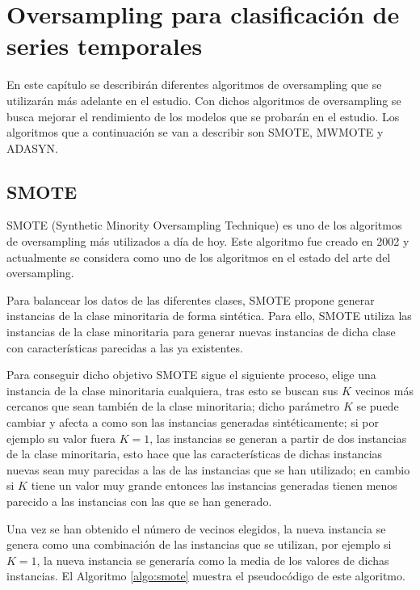 \chapter{Oversampling para clasificación de series temporales}
En este capítulo se describirán diferentes algoritmos de oversampling que se utilizarán más adelante en el estudio. Con dichos algoritmos de oversampling se busca mejorar el rendimiento de los modelos que se probarán en el estudio. Los algoritmos que a continuación se van a describir son SMOTE, MWMOTE y ADASYN.

\section{SMOTE}
SMOTE (Synthetic Minority Oversampling Technique) \cite{chawla2002smote} es uno de los algoritmos de oversampling más utilizados a día de hoy. Este algoritmo fue creado en 2002 y actualmente se considera como uno de los algoritmos en el estado del arte del oversampling.\newline

Para balancear los datos de las diferentes clases, SMOTE propone generar instancias de la clase minoritaria de forma sintética. Para ello, SMOTE utiliza las instancias de la clase minoritaria para generar nuevas instancias de dicha clase con características parecidas a las ya existentes.\newline

Para conseguir dicho objetivo SMOTE sigue el siguiente proceso, elige una instancia de la clase minoritaria cualquiera, tras esto se buscan sus $K$ vecinos más cercanos que sean también de la clase minoritaria; dicho parámetro $K$ se puede cambiar y afecta a como son las instancias generadas sintéticamente; si por ejemplo su valor fuera $K=1$, las instancias se generan a partir de dos instancias de la clase minoritaria, esto hace que las características de dichas instancias nuevas sean muy parecidas a las de las instancias que se han utilizado; en cambio si $K$ tiene un valor muy grande entonces las instancias generadas tienen menos parecido a las instancias con las que se han generado.\newline

Una vez se han obtenido el número de vecinos elegidos, la nueva instancia se genera como una combinación de las instancias que se utilizan, por ejemplo si $K=1$, la nueva instancia se generaría como la media de los valores de dichas instancias. El Algoritmo \ref{algo:smote} muestra el pseudocódigo de este algoritmo.\newline

